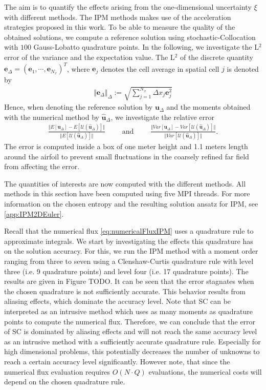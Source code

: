 The aim is to quantify the effects arising from the one-dimensional uncertainty $\xi$ with different methods. The IPM methods makes use of the acceleration strategies proposed in this work. To be able to measure the quality of the obtained solutions, we compute a reference solution using stochastic-Collocation with $100$ Gauss-Lobatto quadrature points. In the following, we investigate the L$^2$ error of the variance and the expectation value. The L$^2$ of the discrete quantity $\bm e_{\Delta}=(\bm e_1,\cdots,\bm e_{N_x})^T$, where $\bm e_j$ denotes the cell average in spatial cell $j$ is denoted by
\begin{align*}
\Vert \bm e_{\Delta} \Vert_{\Delta} := \sqrt{\sum_{j=1}^{N_x} \Delta x_j \bm e_j^2}
\end{align*}
Hence, when denoting the reference solution by $\bm u_{\Delta}$ and the moments obtained with the numerical method by $\hat{\bm u}_{\Delta}$, we investigate the relative error
\begin{align*}
\frac{\Vert E[\bm u_{\Delta}] - E[\mathcal{U}(\bm{\hat u}_{\Delta})] \Vert}{\Vert E[\mathcal{U}(\bm{\hat u}_{\Delta})] \Vert} \qquad \text{ and }\qquad \frac{\Vert Var[\bm u_{\Delta}] - Var[\mathcal{U}(\bm{\hat u}_{\Delta})] \Vert}{\Vert Var[\mathcal{U}(\bm{\hat u}_{\Delta})] \Vert}.
\end{align*}
The error is computed inside a box of one meter height and 1.1 meters length around the airfoil to prevent small fluctuations in the coarsely refined far field from affecting the error.

The quantities of interests are now computed with the different methods. All methods in this section have been computed using five MPI threads. For more information on the chosen entropy and the resulting solution ansatz for IPM, see \ref{app:IPM2DEuler}. 

Recall that the numerical flux \eqref{eq:numericalFluxIPM} uses a quadrature rule to approximate integrals. We start by investigating the effects this quadrature has on the solution accuracy. For this, we run the IPM method with a moment order ranging from three to seven  using a Clenshaw-Curtis quadrature rule with level three (i.e. 9 quadrature points) and level four (i.e. 17 quadrature points). The results are given in Figure TODO. It can be seen that the error stagnates when the chosen quadrature is not sufficiently accurate. This behavior results from aliasing effects, which dominate the accuracy level. Note that SC can be interpreted as an intrusive method which uses as many moments as quadrature points to compute the numerical flux. Therefore, we can conclude that the error of SC is dominated by aliasing effects and will not reach the same accuracy level as an intrusive method with a sufficiently accurate quadrature rule. Especially for high dimensional problems, this potentially decreases the number of unknowns to reach a certain accuracy level significantly. However note, that since the numerical flux evaluation requires $O(N\cdot Q)$ evaluations, the numerical costs will depend on the chosen quadrature rule.

